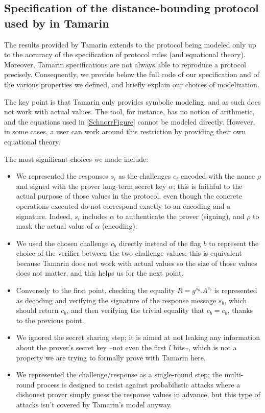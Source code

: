 \appendix

\subsection{Specification of the distance-bounding protocol used by \CROCUS in Tamarin}
\label{apdx:tamarin-spec}

The results provided by Tamarin extends to the protocol being modeled 
only up to the accuracy of the specification of protocol rules (and equational theory).
Moreover, Tamarin specifications are not always able to reproduce a protocol precisely.
Consequently, we provide below the full code of our specification and of the various properties we defined, and briefly explain our choices of modelization.

The key point is that Tamarin only provides symbolic modeling, and as such does not work with actual values. The tool, for instance, has no notion of arithmetic, and the equations used in \cref{SchnorrFigure} cannot be modeled directly. However, in some cases, a user can work around this restriction by providing their own equational theory.

The most significant choices we made include:
\begin{itemize}
	\item We represented the responses $s_i$ as the challenges $c_i$ encoded with the nonce $\rho$ and signed with the prover long-term secret key $\alpha$; this is faithful to the actual purpose of those values in the protocol, even though the concrete operations executed do not correspond exactly to an encoding and a signature. Indeed, $s_i$ includes $\alpha$ to authenticate the prover (signing), and $\rho$ to mask the actual value of $\alpha$ (encoding).
	\item We used the chosen challenge $c_b$ directly instead of the flag $b$ to represent the choice of the verifier between the two challenge values; this is equivalent because Tamarin does not work with actual values so the size of those values does not matter, and this helps us for the next point.
	\item Conversely to the first point, checking the equality $R = g^{s_b}.A^{c_b}$ is represented as decoding and verifying the signature of the response message $s_b$, which should return $c_b$, and then verifying the trivial equality that $c_b = c_b$, thanks to the previous point.
	\item We ignored the secret sharing step; it is aimed at not leaking any information about the prover's secret key --not even the first $l$ bits--, which is not a property we are trying to formally prove with Tamarin here.
	\item We represented the challenge/response as a single-round step; the multi-round process is designed to resist against probabilistic attacks where a dishonest prover simply guess the response values in advance, but this type of attacks isn't covered by Tamarin's model anyway.
\end{itemize}

